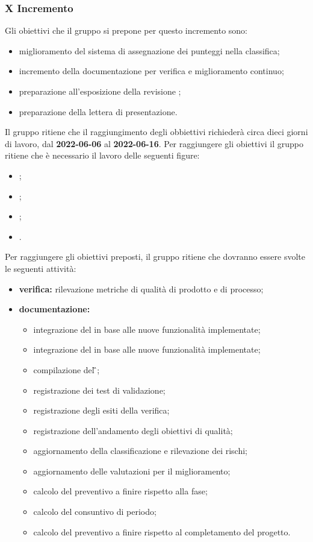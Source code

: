\subsubsection{X Incremento}
Gli obiettivi che il gruppo si prepone per questo incremento sono:
\begin{itemize}
	\item miglioramento del sistema di assegnazione dei punteggi nella classifica;
  	\item incremento della documentazione per verifica e miglioramento continuo;
	  \item preparazione all’esposizione della revisione \CA{};
  	\item preparazione della lettera di presentazione.
\end{itemize}
Il gruppo ritiene che il raggiungimento degli obbiettivi richiederà circa dieci giorni di lavoro, dal \textbf{2022-06-06} al \textbf{2022-06-16}.
Per raggiungere gli obiettivi il gruppo ritiene che è necessario il lavoro delle seguenti figure:
\begin{itemize}
	\item \RE{};
 	\item \AM{};
    \item \PR{};
   	\item \VE{}.
\end{itemize}
Per raggiungere gli obiettivi preposti, il gruppo ritiene che dovranno essere svolte le seguenti attività:
\begin{itemize}
 	\item \textbf{verifica:} rilevazione metriche di qualità di prodotto e di processo;
	\item \textbf{documentazione:} 
	 \begin{itemize}
		\item integrazione del \MU{} in base alle nuove funzionalità implementate;
  		\item integrazione del \MS{} in base alle nuove funzionalità implementate;
		\item compilazione del \G{};
  		\item registrazione dei test di validazione;
    	\item registrazione degli esiti della verifica;
     	\item registrazione dell’andamento degli obiettivi di qualità;
      	\item aggiornamento della classificazione e rilevazione dei rischi;
		\item aggiornamento delle valutazioni per il miglioramento; 
		\item calcolo del preventivo a finire rispetto alla fase;
  		\item calcolo del consuntivo di periodo;
		\item calcolo del preventivo a finire rispetto al completamento del progetto.
	 \end{itemize}
\end{itemize}

